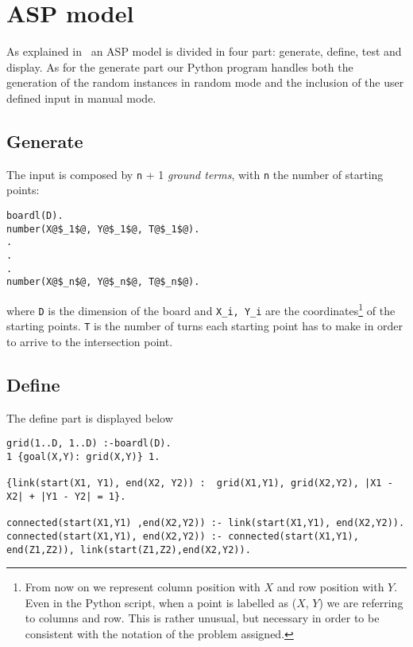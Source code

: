 \section{ASP model}
As explained in~\cite{ClingoGuide} an ASP model is divided in four part: generate, define, test and display.
As for the generate part our Python program handles both the generation of the random instances in random mode and the inclusion of the user defined input in manual mode.
\subsection{Generate}
The input is composed by \texttt{n} + 1 \emph{ground terms}, with \texttt{n} the number of starting points:
\begin{verbatim}
boardl(D).
number(X@$_1$@, Y@$_1$@, T@$_1$@).
.
.
.
number(X@$_n$@, Y@$_n$@, T@$_n$@).
\end{verbatim}
where \texttt{D} is the dimension of the board and \texttt{X_i, Y_i} are the coordinates\footnote{From now on we represent column position with $X$ and row position with $Y$. Even in the Python script, when a point is labelled as ($X$, $Y$) we are referring to columns and row. This is rather unusual, but necessary in order to be consistent with the notation of the problem assigned.} of the starting points. \texttt{T} is the number of turns each starting point has to make in order to arrive to the intersection point.

\subsection{Define}\label{sec:asp-define}
The define part is displayed below
\begin{verbatim}
grid(1..D, 1..D) :-boardl(D).
1 {goal(X,Y): grid(X,Y)} 1.

{link(start(X1, Y1), end(X2, Y2)) :  grid(X1,Y1), grid(X2,Y2), |X1 - X2| + |Y1 - Y2| = 1}. 

connected(start(X1,Y1) ,end(X2,Y2)) :- link(start(X1,Y1), end(X2,Y2)).
connected(start(X1,Y1), end(X2,Y2)) :- connected(start(X1,Y1), end(Z1,Z2)), link(start(Z1,Z2),end(X2,Y2)). 
\end{verbatim}

